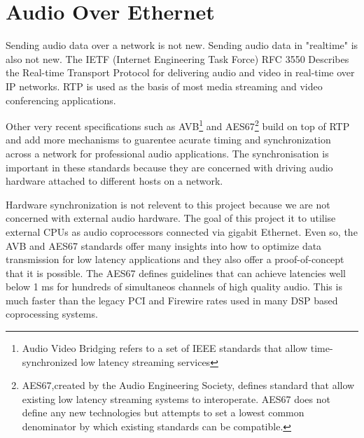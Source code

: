 \section{Audio Over Ethernet}

Sending audio data over a network is not new. Sending audio data in "realtime" is also not new. The IETF (Internet Engineering Task Force) RFC 3550 Describes the Real-time Transport Protocol for delivering audio and video in real-time over IP networks. RTP is used as the basis of most media streaming and video conferencing applications.

Other very recent specifications such as AVB\footnote{Audio Video Bridging refers to a set of IEEE standards that allow time-synchronized low latency streaming services } and AES67\footnote{AES67,created by the Audio Engineering Society, defines standard that allow existing low latency streaming systems to interoperate. AES67 does not define any new technologies but attempts to set a lowest common denominator by which existing standards can be compatible. } build on top of RTP and add more mechanisms to guarentee acurate timing and synchronization across a network for professional audio applications. The synchronisation is important in these standards because they are concerned with driving audio hardware attached to different hosts on a network.

Hardware synchronization is not relevent to this project because we are not concerned with external audio hardware. The goal of this project it to utilise external CPUs as audio coprocessors connected via gigabit Ethernet. Even so, the AVB and AES67 standards offer many insights into how to optimize data transmission for low latency applications and they also offer a proof-of-concept that it is possible. The AES67 defines guidelines that can achieve latencies well below 1 ms for hundreds of simultaneos channels of high quality audio. This is much faster than the legacy PCI and Firewire rates used in many DSP based coprocessing systems\cite{bouillot2009aes}.
